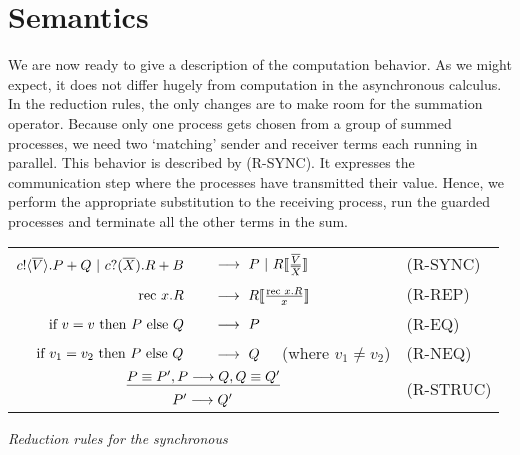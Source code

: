\section{Semantics}
We are now ready to give a description of the computation behavior.  
As we might expect, it does not differ hugely from computation in the asynchronous calculus.  
In the reduction rules, the only changes are to make room for the summation operator.
Because only one process gets chosen from a group of summed processes, we need two `matching' sender and receiver terms each running in parallel.  This behavior is described by (R-SYNC).  
It expresses the communication step where the processes have transmitted their value.  Hence, we perform the appropriate substitution to the receiving process, run the guarded processes and terminate all the other terms in the sum.
\begin{insettable}
\begin{center}\begin{tabular}{rll}
	${c}!\langle{ \ensuremath{\overline{V}} }\rangle. P + Q \ |\  {c}?({\overline{X}}).R + B$\ &\  $\pred\  P \comp R\subst{\tuple{V}}{\tuple{X}}$ & \tiny{(R-SYNC)}\\
	$\text{rec }{x}.R$\ &\  $\pred\  R\subst{\rec{x}R}{x}$ & \tiny{(R-REP)}\\
	$\text{if } {v = v}\text{ then } P \text{ else } Q$\ &\ $\pred\ P$ & \tiny{(R-EQ)}\\
	$\text{if } {v_1 = v_2}\text{ then } P \text{ else } Q$\ &\ $\pred\ Q$ \ \ (where $v_1\neq v_2$)& \tiny{(R-NEQ)}\\
	\multicolumn{2}{c}{\hspace{4.5em}$\underline{P\equiv P', P \longrightarrow Q, Q\equiv Q'}$} & \multirow{2}{*}{\tiny{(R-STRUC)}}\\
	\multicolumn{2}{c}{\hspace{4.5em}$P'\longrightarrow Q'$}
\end{tabular}
\caption{\emph{Reduction rules for the synchronous \picalc}}\label{spireducs}
\end{center}
\end{insettable}

